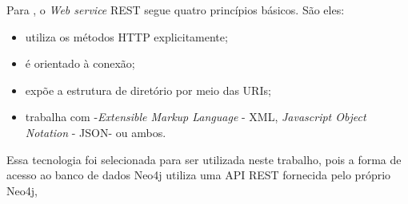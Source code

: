 
Para , o \textit{Web service} REST segue quatro princípios básicos. São eles: 

\begin{itemize}
	\item utiliza os métodos HTTP explicitamente;
	\item é orientado à conexão;
	\item expõe a estrutura de diretório por meio das URIs;
	\item trabalha com -\textit{Extensible Markup Language} - XML\footnotemark[24], \textit{Javascript Object Notation} - JSON\footnotemark[25] - ou ambos.
\end{itemize}



Essa tecnologia foi selecionada para ser utilizada neste trabalho, pois a forma de acesso ao banco de dados Neo4j utiliza uma API REST fornecida pelo próprio Neo4j,